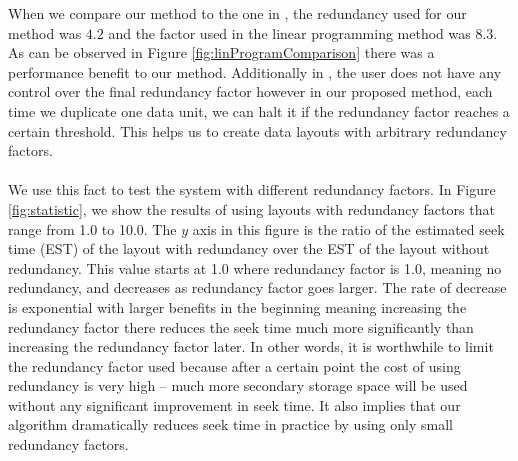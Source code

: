 When we compare our method to the one in \cite{optimizingredundancy}, the redundancy used for our method was $4.2$ and the factor used in the linear programming method was $8.3$. As can be observed in Figure \ref{fig:linProgramComparison} there was a performance benefit to our method. Additionally in \cite{optimizingredundancy}, the user does not have any control over the final redundancy factor however in our proposed method, each time we duplicate one data unit, we can halt it if the redundancy factor reaches a certain threshold. This helps us to create data layouts with arbitrary redundancy factors. \\
\\
We use this fact to test the system with different redundancy factors. In Figure \ref{fig:statistic}, we show the results of using layouts with redundancy factors that range from 1.0 to 10.0. The $y$ axis in this figure is the ratio of the estimated seek time (EST) of the layout with redundancy over the EST of the layout without redundancy. This value starts at 1.0 where redundancy factor is 1.0, meaning no redundancy, and decreases as redundancy factor goes larger. The rate of decrease is exponential with larger benefits in the beginning meaning increasing the redundancy factor there reduces the seek time much more significantly than increasing the redundancy factor later. In other words, it is worthwhile to limit the redundancy factor used because after a certain point the cost of using redundancy is very high -- much more secondary storage space will be used without any significant improvement in seek time. It also implies that our algorithm dramatically reduces seek time in practice by using only small redundancy factors. 


